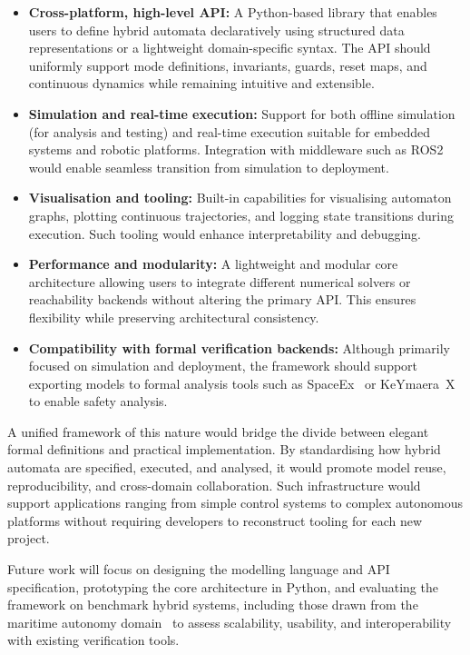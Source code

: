 \documentclass[a4paper, 12pt]{report}
\begin{document}
\begin{itemize}

\item \textbf{Cross-platform, high-level API:}
A Python-based library that enables users to define hybrid automata
declaratively using structured data representations or a lightweight
domain-specific syntax.  The API should uniformly support mode definitions,
invariants, guards, reset maps, and continuous dynamics while remaining
intuitive and extensible.

\item \textbf{Simulation and real-time execution:}
Support for both offline simulation (for analysis and testing) and real-time
execution suitable for embedded systems and robotic platforms.  Integration
with middleware such as ROS2 would enable seamless transition from
simulation to deployment.

\item \textbf{Visualisation and tooling:}
Built-in capabilities for visualising automaton graphs, plotting continuous
trajectories, and logging state transitions during execution.  Such tooling
would enhance interpretability and debugging.

\item \textbf{Performance and modularity:}
A lightweight and modular core architecture allowing users to integrate
different numerical solvers or reachability backends without altering the
primary API.  This ensures flexibility while preserving architectural
consistency.

\item \textbf{Compatibility with formal verification backends:}
Although primarily focused on simulation and deployment, the framework
should support exporting models to formal analysis tools such as
SpaceEx~\cite{Frehse2011SpaceEx} or KeYmaera~X~\cite{Platzer2018KeYmaera}
to enable safety analysis.

\end{itemize}

A unified framework of this nature would bridge the divide between elegant
formal definitions and practical implementation.  By standardising how
hybrid automata are specified, executed, and analysed, it would promote
model reuse, reproducibility, and cross-domain collaboration.  Such
infrastructure would support applications ranging from simple control
systems to complex autonomous platforms without requiring developers to
reconstruct tooling for each new project.

Future work will focus on designing the modelling language and API
specification, prototyping the core architecture in Python, and evaluating
the framework on benchmark hybrid systems, including those drawn from the
maritime autonomy domain~\cite{SINGH2026123919} to assess scalability,
usability, and interoperability with existing verification tools.



\end{document}
